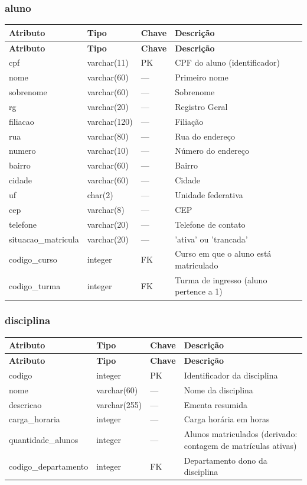 \documentclass[12pt,a4paper]{article}
\begin{document}
\subsubsection{aluno}

\begin{longtable}{@{}llll@{}}
\toprule
\textbf{Atributo} & \textbf{Tipo} & \textbf{Chave} & \textbf{Descrição} \\
\midrule
\endfirsthead
\toprule
\textbf{Atributo} & \textbf{Tipo} & \textbf{Chave} & \textbf{Descrição} \\
\midrule
\endhead
cpf & varchar(11) & PK & CPF do aluno (identificador) \\
nome & varchar(60) & --- & Primeiro nome \\
sobrenome & varchar(60) & --- & Sobrenome \\
rg & varchar(20) & --- & Registro Geral \\
filiacao & varchar(120) & --- & Filiação \\
rua & varchar(80) & --- & Rua do endereço \\
numero & varchar(10) & --- & Número do endereço \\
bairro & varchar(60) & --- & Bairro \\
cidade & varchar(60) & --- & Cidade \\
uf & char(2) & --- & Unidade federativa \\
cep & varchar(8) & --- & CEP \\
telefone & varchar(20) & --- & Telefone de contato \\
situacao\_matricula & varchar(20) & --- & 'ativa' ou 'trancada' \\
codigo\_curso & integer & FK & Curso em que o aluno está matriculado \\
codigo\_turma & integer & FK & Turma de ingresso (aluno pertence a 1) \\
\bottomrule
\end{longtable}

\subsubsection{disciplina}

\begin{longtable}{@{}lllp{}@{}}
\toprule
\textbf{Atributo} & \textbf{Tipo} & \textbf{Chave} & \textbf{Descrição} \\
\midrule
\endfirsthead
\toprule
\textbf{Atributo} & \textbf{Tipo} & \textbf{Chave} & \textbf{Descrição} \\
\midrule
\endhead
codigo & integer & PK & Identificador da disciplina \\
nome & varchar(60) & --- & Nome da disciplina \\
descricao & varchar(255) & --- & Ementa resumida \\
carga\_horaria & integer & --- & Carga horária em horas \\
quantidade\_alunos & integer & --- & Alunos matriculados (derivado:
contagem de matrículas ativas) \\
codigo\_departamento & integer & FK & Departamento dono da disciplina \\
\bottomrule
\end{longtable}
\end{document}
